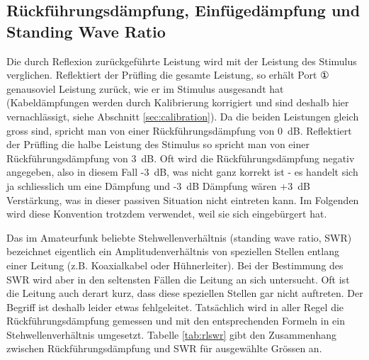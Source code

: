 \documentclass[twoside,a4paper,11pt,halfparskip,DIV=11,notitlepage]{scrartcl}
\begin{document}
\subsection{Rückführungsdämpfung, Einfügedämpfung und Standing Wave Ratio}

Die durch Reflexion zurückgeführte Leistung wird mit der Leistung des Stimulus verglichen. Reflektiert
der Prüfling die gesamte Leistung, so erhält Port ① genausoviel Leistung zurück, wie er im Stimulus
ausgesandt hat (Kabeldämpfungen werden durch Kalibrierung korrigiert und sind deshalb hier vernachlässigt,
siehe Abschnitt \ref{sec:calibration}). Da die beiden Leistungen gleich gross sind, spricht man von
einer Rückführungsdämpfung von 0~dB. Reflektiert der Prüfling die halbe Leistung des Stimulus so spricht
man von einer Rückführungsdämpfung von 3~dB. Oft wird die Rückführungsdämpfung negativ angegeben, also
in diesem Fall -3~dB, was nicht ganz korrekt ist - es handelt sich ja schliesslich um eine Dämpfung 
und -3~dB Dämpfung wären +3~dB Verstärkung, was in dieser passiven Situation nicht eintreten kann.
Im Folgenden wird diese Konvention trotzdem verwendet, weil sie sich eingebürgert hat.


Das im Amateurfunk beliebte Stehwellenverhältnis (standing wave ratio, SWR) bezeichnet eigentlich
ein Amplitudenverhältnis von speziellen Stellen entlang einer Leitung (z.B. Koaxialkabel oder
Hühnerleiter). Bei der Bestimmung des SWR wird aber in den seltensten Fällen die Leitung an sich
untersucht. Oft ist die Leitung auch derart kurz, dass diese speziellen Stellen gar nicht auftreten.
Der Begriff ist deshalb leider etwas fehlgeleitet. Tatsächlich wird in aller Regel die Rückführungsdämpfung
gemessen und mit den entsprechenden Formeln in ein Stehwellenverhältnis umgesetzt. Tabelle \ref{tab:rlswr}
gibt den Zusammenhang zwischen Rückführungsdämpfung und SWR für ausgewählte Grössen an.
\end{document}
